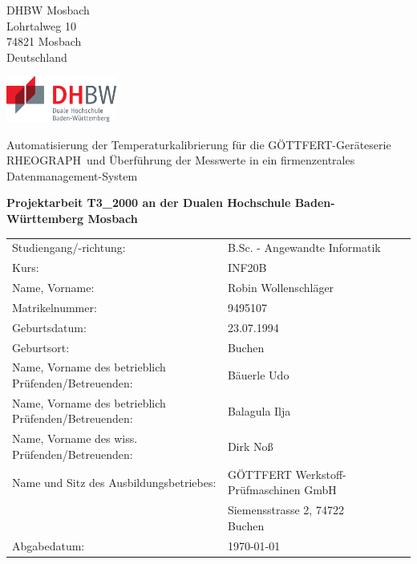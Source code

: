 \def\title{Automatisierung der Temperaturkalibrierung für die GÖTTFERT-Geräteserie \glqq RHEOGRAPH\grqq\ und Überführung der Messwerte in ein firmenzentrales Datenmanagement-System}
\def\author{Robin Wollenschläger}

\begin{titlepage}


    \begin{minipage}[t]{0.25\textwidth}
        DHBW Mosbach\\
        Lohrtalweg 10\\
        74821 Mosbach\\
        Deutschland
    \end{minipage}
    \hfill
    \begin{minipage}[t]{0.25\textwidth}
        \includegraphics[height=1.5cm]{prefix/image/logo-dhbw.eps}
    \end{minipage}




    \begin{center}
        \vspace{10mm}

        \huge \title

        \vspace{5mm}

        \large \bfseries Projektarbeit T3\_2000 an der Dualen Hochschule Baden-Württemberg Mosbach


    \end{center}

    \vspace{10mm}

    \begin{tabular}[ht]{ l p{4cm} l p{4cm} }
        Studiengang/-richtung:                               & B.Sc. - Angewandte Informatik  \tabularnewline
        Kurs:                                                & INF20B\tabularnewline
        Name, Vorname:                                       & \author \tabularnewline
        Matrikelnummer:                                      & 9495107\tabularnewline
        Geburtsdatum:                                        & 23.07.1994\tabularnewline
        Geburtsort:                                          & Buchen\tabularnewline
        Name, Vorname des betrieblich Prüfenden/Betreuenden: & Bäuerle Udo \tabularnewline
        Name, Vorname des betrieblich Prüfenden/Betreuenden: & Balagula Ilja \tabularnewline
        Name, Vorname des wiss. Prüfenden/Betreuenden:       & Dirk Noß \tabularnewline
        Name und Sitz des Ausbildungsbetriebes:              & GÖTTFERT Werkstoff-Prüfmaschinen GmbH \tabularnewline
                                                             & Siemensstrasse 2, 74722 Buchen \tabularnewline
        Abgabedatum:                                         & \today \tabularnewline
    \end{tabular}


\end{titlepage}
